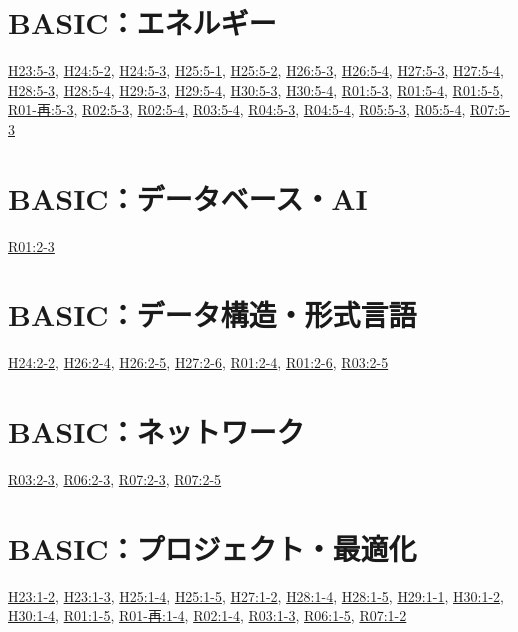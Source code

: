 \section{BASIC：エネルギー}
\hyperref[q:h23-reg-basic-5-3]{H23:5-3}, \hyperref[q:h24-reg-basic-5-2]{H24:5-2}, \hyperref[q:h24-reg-basic-5-3]{H24:5-3}, \hyperref[q:h25-reg-basic-5-1]{H25:5-1}, \hyperref[q:h25-reg-basic-5-2]{H25:5-2}, \hyperref[q:h26-reg-basic-5-3]{H26:5-3}, \hyperref[q:h26-reg-basic-5-4]{H26:5-4}, \hyperref[q:h27-reg-basic-5-3]{H27:5-3}, \hyperref[q:h27-reg-basic-5-4]{H27:5-4}, \hyperref[q:h28-reg-basic-5-3]{H28:5-3}, \hyperref[q:h28-reg-basic-5-4]{H28:5-4}, \hyperref[q:h29-reg-basic-5-3]{H29:5-3}, \hyperref[q:h29-reg-basic-5-4]{H29:5-4}, \hyperref[q:h30-reg-basic-5-3]{H30:5-3}, \hyperref[q:h30-reg-basic-5-4]{H30:5-4}, \hyperref[q:r01-reg-basic-5-3]{R01:5-3}, \hyperref[q:r01-reg-basic-5-4]{R01:5-4}, \hyperref[q:r01-reg-basic-5-5]{R01:5-5}, \hyperref[q:r01-ret-basic-5-3]{R01-再:5-3}, \hyperref[q:r02-reg-basic-5-3]{R02:5-3}, \hyperref[q:r02-reg-basic-5-4]{R02:5-4}, \hyperref[q:r03-reg-basic-5-4]{R03:5-4}, \hyperref[q:r04-reg-basic-5-3]{R04:5-3}, \hyperref[q:r04-reg-basic-5-4]{R04:5-4}, \hyperref[q:r05-reg-basic-5-3]{R05:5-3}, \hyperref[q:r05-reg-basic-5-4]{R05:5-4}, \hyperref[q:r07-reg-basic-5-3]{R07:5-3}
\section{BASIC：データベース・AI}
\hyperref[q:r01-reg-basic-2-3]{R01:2-3}
\section{BASIC：データ構造・形式言語}
\hyperref[q:h24-reg-basic-2-2]{H24:2-2}, \hyperref[q:h26-reg-basic-2-4]{H26:2-4}, \hyperref[q:h26-reg-basic-2-5]{H26:2-5}, \hyperref[q:h27-reg-basic-2-6]{H27:2-6}, \hyperref[q:r01-reg-basic-2-4]{R01:2-4}, \hyperref[q:r01-reg-basic-2-6]{R01:2-6}, \hyperref[q:r03-reg-basic-2-5]{R03:2-5}
\section{BASIC：ネットワーク}
\hyperref[q:r03-reg-basic-2-3]{R03:2-3}, \hyperref[q:r06-reg-basic-2-3]{R06:2-3}, \hyperref[q:r07-reg-basic-2-3]{R07:2-3}, \hyperref[q:r07-reg-basic-2-5]{R07:2-5}
\section{BASIC：プロジェクト・最適化}
\hyperref[q:h23-reg-basic-1-2]{H23:1-2}, \hyperref[q:h23-reg-basic-1-3]{H23:1-3}, \hyperref[q:h25-reg-basic-1-4]{H25:1-4}, \hyperref[q:h25-reg-basic-1-5]{H25:1-5}, \hyperref[q:h27-reg-basic-1-2]{H27:1-2}, \hyperref[q:h28-reg-basic-1-4]{H28:1-4}, \hyperref[q:h28-reg-basic-1-5]{H28:1-5}, \hyperref[q:h29-reg-basic-1-1]{H29:1-1}, \hyperref[q:h30-reg-basic-1-2]{H30:1-2}, \hyperref[q:h30-reg-basic-1-4]{H30:1-4}, \hyperref[q:r01-reg-basic-1-5]{R01:1-5}, \hyperref[q:r01-ret-basic-1-4]{R01-再:1-4}, \hyperref[q:r02-reg-basic-1-4]{R02:1-4}, \hyperref[q:r03-reg-basic-1-3]{R03:1-3}, \hyperref[q:r06-reg-basic-1-5]{R06:1-5}, \hyperref[q:r07-reg-basic-1-2]{R07:1-2}
